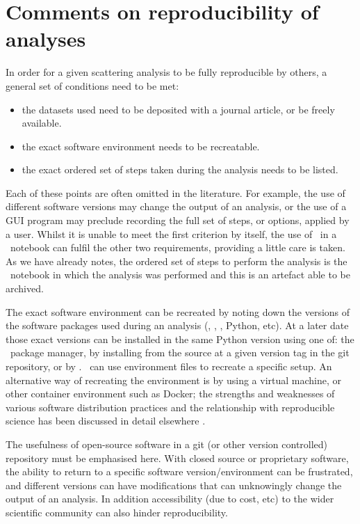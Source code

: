 \documentclass[pdf,preprint]{iucr}
\begin{document}

\section{Comments on reproducibility of analyses}

In order for a given scattering analysis to be fully reproducible by others, a general set of conditions need to be met:
\begin{itemize}
  \item the datasets used need to be deposited with a journal article, or be freely available.
  \item the exact software environment needs to be recreatable.
  \item the exact ordered set of steps taken during the analysis needs to be listed.
\end{itemize} 
Each of these points are often omitted in the literature. For example, the use of different software versions may change the output of an analysis, or the use of a GUI program may preclude recording the full set of steps, or options, applied by a user. Whilst it is unable to meet the first criterion by itself, the use of \ in a \Jupyter\ notebook can fulfil the other two requirements, providing a little care is taken. As we have already notes, the ordered set of steps to perform the analysis is the \Jupyter\ notebook in which the analysis was performed and this is an artefact able to be archived.

The exact software environment can be recreated by noting down the versions of the software packages used during an analysis (, \SciPy, \NumPy, Python, etc). At a later date those exact versions can be installed in the same Python version using one of: the \conda\ package manager, by installing from the source at a given version tag in the git repository, or by \pip. \conda\ can use environment files to recreate a specific setup. An alternative way of recreating the environment is by using a virtual machine, or other container environment such as Docker; the strengths and weaknesses of various software distribution practices and the relationship with reproducible science has been discussed in detail elsewhere \cite{Moeller2017a}.

The usefulness of open-source software in a git (or other version controlled) repository must be emphasised here. With closed source or proprietary software, the ability to return to a specific software version/environment can be frustrated, and different versions can have modifications that can unknowingly change the output of an analysis. In addition accessibility (due to cost, etc) to the wider scientific community can also hinder reproducibility.
\end{document}
